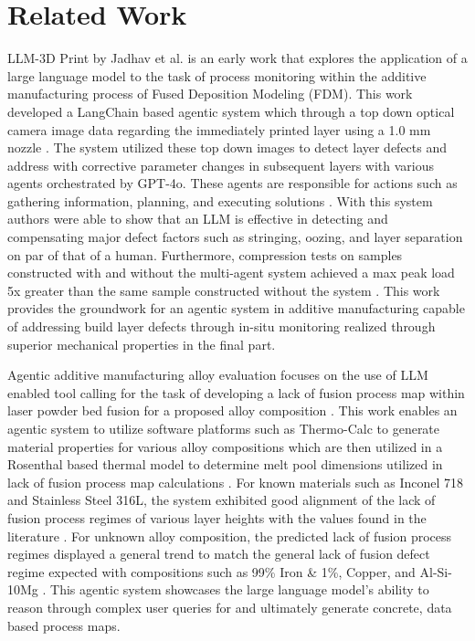 \section{Related Work}

LLM-3D Print by Jadhav et al. \cite{jadhav_llm-3d_2025} is an early work that
explores the application of a large language model to the task of process
monitoring within the additive manufacturing process of Fused Deposition
Modeling (FDM). This work developed a LangChain based agentic system which
through a top down optical camera image data regarding the immediately printed
layer using a 1.0 mm nozzle \cite{jadhav_llm-3d_2025}. The system utilized these
top down images to detect layer defects and address with corrective parameter
changes in subsequent layers with various agents orchestrated by GPT-4o. These
agents are responsible for actions such as gathering information, planning, and
executing solutions \cite{jadhav_llm-3d_2025}. With this system authors were
able to show that an LLM is effective in detecting and compensating major defect
factors such as stringing, oozing, and layer separation on par of that of a
human. Furthermore, compression tests on samples constructed with and without
the multi-agent system achieved a max peak load 5x greater than the same sample
constructed without the system \cite{jadhav_llm-3d_2025}. This work provides the
groundwork for an agentic system in additive manufacturing capable of addressing
build layer defects through in-situ monitoring realized through superior
mechanical properties in the final part.

Agentic additive manufacturing alloy evaluation focuses on the use of LLM
enabled tool calling for the task of developing a lack of fusion process map
within laser powder bed fusion for a proposed alloy composition
\cite{pak_agentic_2026}. This work enables an agentic system to utilize software
platforms such as Thermo-Calc to generate material properties for various alloy
compositions which are then utilized in a Rosenthal based thermal model to
determine melt pool dimensions utilized in lack of fusion process map
calculations \cite{pak_agentic_2026}. For known materials such as Inconel 718
and Stainless Steel 316L, the system exhibited good alignment of the lack of
fusion process regimes of various layer heights with the values found in the
literature \cite{pak_agentic_2026}. For unknown alloy composition, the predicted
lack of fusion process regimes displayed a general trend to match the general
lack of fusion defect regime expected with compositions such as 99\% Iron \&
1\%, Copper, and Al-Si-10Mg \cite{pak_agentic_2026}. This agentic system
showcases the large language model's ability to reason through complex user
queries for and ultimately generate concrete, data based process maps.

